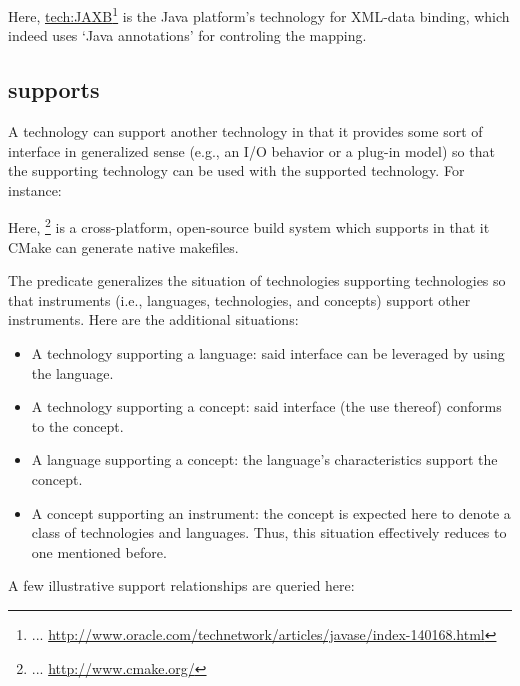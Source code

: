 
\noindent
Here, \url{tech:JAXB}\footnote{... 
  \url{http://www.oracle.com/technetwork/articles/javase/index-140168.html}}
is the Java platform's technology for XML-data binding, which indeed
uses `Java annotations' for controling the mapping.


\subsection{supports}

A technology can support another technology in that it provides some
sort of interface in generalized sense (e.g., an I/O behavior or a
plug-in model) so that the supporting technology can be used with the
supported technology. For instance:


\noindent
Here, \footnote{... 
  \url{http://www.cmake.org/}} is a cross-platform, open-source build
system which supports  in that it CMake can generate
native makefiles.

The predicate  generalizes the situation of
technologies supporting technologies so that instruments (i.e.,
languages, technologies, and concepts) support other instruments. Here
are the additional situations:
%
\begin{itemize}
\item A technology supporting a language: said interface can be
  leveraged by using the language.
\item A technology supporting a concept: said interface (the use
  thereof) conforms to the concept.
\item A language supporting a concept: the language's characteristics
  support the concept.
\item A concept supporting an instrument: the concept is expected here
  to denote a class of technologies and languages. Thus, this
  situation effectively reduces to one mentioned before.
\end{itemize}

\noindent
A few illustrative support relationships are queried here:



